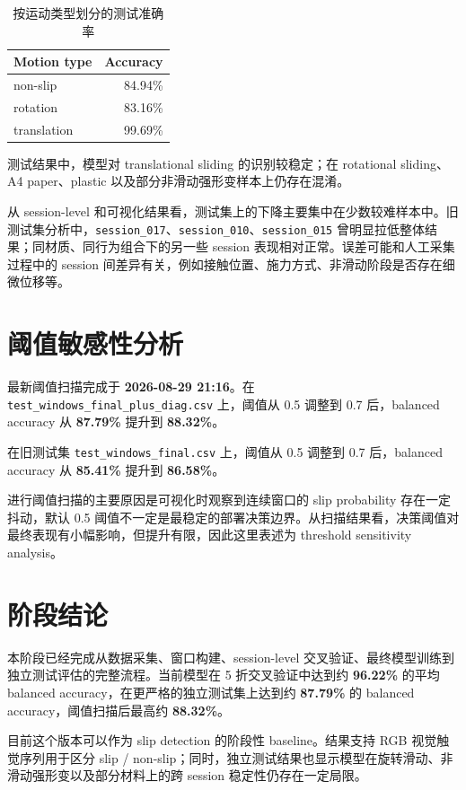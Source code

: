 \documentclass[UTF8,a4paper,11pt]{ctexart}
\begin{document}
\begin{table}[h]
\centering
\caption{按运动类型划分的测试准确率}
\begin{tabular}{lr}
\toprule
Motion type & Accuracy \\
\midrule
non-slip & 84.94\% \\
rotation & 83.16\% \\
translation & 99.69\% \\
\bottomrule
\end{tabular}
\end{table}

测试结果中，模型对 translational sliding 的识别较稳定；在 rotational sliding、A4 paper、plastic 以及部分非滑动强形变样本上仍存在混淆。

从 session-level 和可视化结果看，测试集上的下降主要集中在少数较难样本中。旧测试集分析中，\texttt{session\_017}、\texttt{session\_010}、\texttt{session\_015} 曾明显拉低整体结果；同材质、同行为组合下的另一些 session 表现相对正常。误差可能和人工采集过程中的 session 间差异有关，例如接触位置、施力方式、非滑动阶段是否存在细微位移等。

\section{阈值敏感性分析}

最新阈值扫描完成于 \textbf{2026-08-29 21:16}。在 \texttt{test\_windows\_final\_plus\_diag.csv} 上，阈值从 0.5 调整到 0.7 后，balanced accuracy 从 \textbf{87.79\%} 提升到 \textbf{88.32\%}。

在旧测试集 \texttt{test\_windows\_final.csv} 上，阈值从 0.5 调整到 0.7 后，balanced accuracy 从 \textbf{85.41\%} 提升到 \textbf{86.58\%}。

进行阈值扫描的主要原因是可视化时观察到连续窗口的 slip probability 存在一定抖动，默认 0.5 阈值不一定是最稳定的部署决策边界。从扫描结果看，决策阈值对最终表现有小幅影响，但提升有限，因此这里表述为 threshold sensitivity analysis。

\section{阶段结论}

本阶段已经完成从数据采集、窗口构建、session-level 交叉验证、最终模型训练到独立测试评估的完整流程。当前模型在 5 折交叉验证中达到约 \textbf{96.22\%} 的平均 balanced accuracy，在更严格的独立测试集上达到约 \textbf{87.79\%} 的 balanced accuracy，阈值扫描后最高约 \textbf{88.32\%}。

目前这个版本可以作为 slip detection 的阶段性 baseline。结果支持 RGB 视觉触觉序列用于区分 slip / non-slip；同时，独立测试结果也显示模型在旋转滑动、非滑动强形变以及部分材料上的跨 session 稳定性仍存在一定局限。
\end{document}
